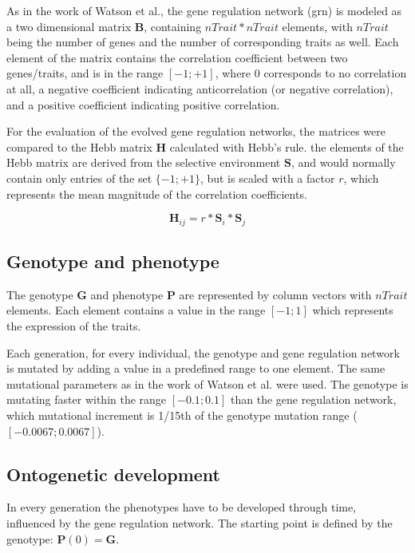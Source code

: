 \documentclass{article}
\begin{document}
As in the work of Watson et al., the gene regulation network (grn) is modeled as a two dimensional matrix $\bm{B}$, containing $nTrait * nTrait$ elements, with $nTrait$ being the number of genes and the number of corresponding traits as well.
Each element of the matrix contains the correlation coefficient between two genes/traits, and is in the range $[-1; +1]$, where 0 corresponds to no correlation at all, a negative coefficient indicating anticorrelation (or negative correlation), and a positive coefficient indicating positive correlation.

For the evaluation of the evolved gene regulation networks, the matrices were compared to the Hebb matrix $\bm{H}$ calculated with Hebb's rule.
the elements of the Hebb matrix are derived from the selective environment $\bm{S}$, and would normally contain only entries of the set $\{-1; +1\}$, but is scaled with a factor $r$, which represents the mean magnitude of the correlation coefficients.

\begin{equation}
	\bm{H}_{ij} = r * \bm{S}_i * \bm{S}_j
\end{equation}

\subsection{Genotype and phenotype}

The genotype $\bm{G}$ and phenotype $\bm{P}$ are represented by column vectors with $nTrait$ elements. Each element contains a value in the range $[-1; 1]$ which represents the expression of the traits.

Each generation, for every individual, the genotype and gene regulation network is mutated by adding a value in a predefined range to one element.
The same mutational parameters as in the work of Watson et al. were used.
The genotype is mutating faster within the range $[-0.1; 0.1]$ than the gene regulation network, which mutational increment is 1/15th of the genotype mutation range ($[-0.0067; 0.0067]$).

\subsection{Ontogenetic development}

In every generation the phenotypes have to be developed through time, influenced by the gene regulation network. The starting point is defined by the genotype: $\bm{P}(0) = \bm{G}$.
\end{document}
